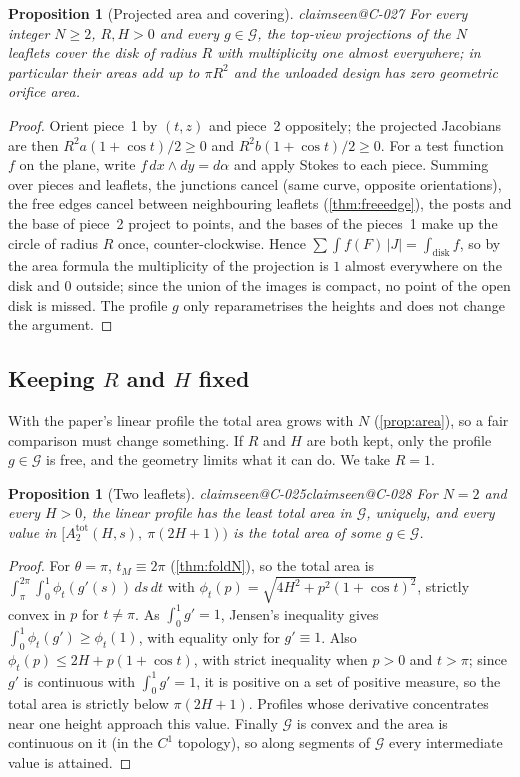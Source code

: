 \documentclass[11pt,a4paper]{article}
\makeatletter
\theoremstyle{plain}
\newtheorem{proposition}[theorem]{Proposition}
\theoremstyle{remark}
\newcommand{\claim}[1]{\ifcsname claimseen@#1\endcsname\else\expandafter\gdef\csname claimseen@#1\endcsname{}\label{claim:#1}\fi}
\makeatother
\begin{document}
\begin{proposition}[Projected area and covering]\label{prop:cover}\claim{C-027}
For every integer $N\ge2$, $R,H>0$ and every $g\in\mathcal G$, the top-view projections of the $N$ leaflets cover the disk
of radius $R$ with multiplicity one almost everywhere; in particular their areas add up to $\pi R^2$ and the unloaded
design has zero geometric orifice area.
\end{proposition}
\begin{proof}
Orient piece~1 by $(t,z)$ and piece~2 oppositely; the projected Jacobians are then $R^2a(1+\cos t)/2\ge0$ and
$R^2b(1+\cos t)/2\ge0$. For a test function $f$ on the plane, write $f\,dx\wedge dy=d\alpha$ and apply Stokes to each piece.
Summing over pieces and leaflets, the junctions cancel (same curve, opposite orientations), the free edges cancel between
neighbouring leaflets (\cref{thm:freeedge}), the posts and the base of piece~2 project to points, and the bases of the
pieces~1 make up the circle of radius $R$ once, counter-clockwise. Hence $\sum\int f(F)\,|J|=\int_{\text{disk}}f$, so by the
area formula the multiplicity of the projection is $1$ almost everywhere on the disk and $0$ outside; since the union of the
images is compact, no point of the open disk is missed. The profile $g$ only reparametrises the heights and does not
change the argument.
\end{proof}

\subsection{Keeping $R$ and $H$ fixed}
With the paper's linear profile the total area grows with $N$ (\cref{prop:area}), so a fair comparison must change
something. If $R$ and $H$ are both kept, only the profile $g\in\mathcal G$ is free, and the geometry limits what it can do.
We take $R=1$.

\begin{proposition}[Two leaflets]\label{prop:two}\claim{C-025}\claim{C-028}
For $N=2$ and every $H>0$, the linear profile has the least total area in $\mathcal G$, uniquely, and every value in
$[A^{\mathrm{tot}}_2(H,s),\ \pi(2H+1))$ is the total area of some $g\in\mathcal G$.
\end{proposition}
\begin{proof}
For $\theta=\pi$, $t_M\equiv2\pi$ (\cref{thm:foldN}), so the total area is $\int_\pi^{2\pi}\!\int_0^1\phi_t(g'(s))\,ds\,dt$ with
$\phi_t(p)=\sqrt{4H^2+p^2(1+\cos t)^2}$, strictly convex in $p$ for $t\ne\pi$. As $\int_0^1g'=1$, Jensen's inequality gives
$\int_0^1\phi_t(g')\ge\phi_t(1)$, with equality only for $g'\equiv1$. Also $\phi_t(p)\le2H+p(1+\cos t)$, with strict inequality when $p>0$ and $t>\pi$; since $g'$ is continuous with
$\int_0^1g'=1$, it is positive on a set of positive measure, so the total area is strictly below $\pi(2H+1)$. Profiles whose
derivative concentrates near one height approach this value. Finally $\mathcal G$ is convex and
the area is continuous on it (in the $C^1$ topology), so along segments of $\mathcal G$ every intermediate value is attained.
\end{proof}
\end{document}
